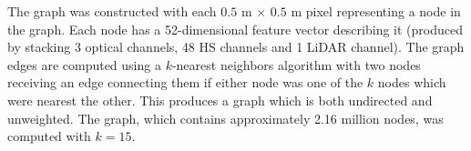 \documentclass[
twocolumn,
]{ceurart}
\begin{document}
The graph was constructed with each $0.5$ m $\times$ $0.5$ m pixel representing a node in the graph.
Each node has a 52-dimensional feature vector describing it (produced by stacking 3 optical channels, 48 HS channels and 1 LiDAR channel).
The graph edges are computed using a $k$-nearest neighbors algorithm with two nodes receiving an edge connecting them if either node was one of the $k$ nodes which were nearest the other.
This produces a graph which is both undirected and unweighted.
The graph, which contains approximately 2.16 million nodes, was computed with $k=15$.

\end{document}
